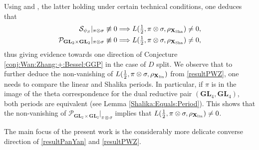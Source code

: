 \documentclass[11pt, reqno]{amsart}
\theoremstyle{plain}
\theoremstyle{definition}
\theoremstyle{remark}
\theoremstyle{plain}
\def\GL{\mathbf{GL}}
\begin{document}
Using \cite[Theorem 5.11]{PanYan} and \cite[Corollary 1.3(6)]{Pollack:Wan:Zydor}, the latter holding under certain technical conditions, one deduces that \begin{align} \mathcal{S}_{\psi_S}|_{\pi \otimes \sigma} \not \equiv 0 \Longrightarrow L(\tfrac{1}{2},\pi \otimes \sigma,\rho_{\mathbf{X}_{\rm Sha}})\neq 0,\label{resultPanYan} \\ \mathcal{P}_{\GL_2\times \GL_2}|_{\pi \otimes \sigma} \not \equiv 0 \Longrightarrow L(\tfrac{1}{2},\pi \otimes \sigma,\rho_{\mathbf{X}_{\rm Sha}})\neq 0,\label{resultPWZ}
\end{align}
thus giving evidence towards one direction of Conjecture \ref{conj:Wan:Zhang:+:Bessel:GGP} in the case of $D$ split. We observe that to further deduce the non-vanishing of $L(\tfrac{1}{2}, \pi \otimes \sigma, \rho_{\mathbf{X}_{\rm lin}})$  from \eqref{resultPWZ}, one needs to compare the linear and Shalika periods. In particular, if $\pi$ is in the image of the theta correspondence for the dual reductive pair $(\GL_4,\GL_4)$, both periods are equivalent (see Lemma \ref{Shalika:Equals:Period}). This shows that the non-vanishing of $\mathcal{P}_{\GL_2\times \GL_2}|_{\pi \otimes \sigma}$ implies that $L(\tfrac{1}{2},\pi \otimes \sigma,\rho_{\mathbf{X}_{\rm lin}})\neq 0$.

\noindent The main focus of the present work is the considerably more delicate converse direction of \eqref{resultPanYan} and \eqref{resultPWZ}.
\end{document}
